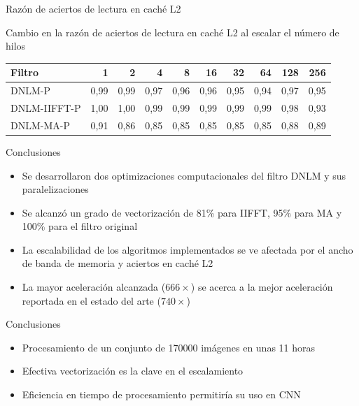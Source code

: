 \documentclass[15pt]{beamer} %
\begin{document}
\begin{frame}{Raz\'on de aciertos de lectura en cach\'e L2}
  
  \begin{center}
  \setlength\tabcolsep{2.5pt}
   \setlength{\textfloatsep}{25mm}
    {\footnotesize Cambio en la raz\'on de aciertos de lectura en cach\'e L2 al escalar el n\'umero de hilos}
    \begin{tabular}{lrrrrrrrrr}
	 Filtro & 1 & 2 & 4 & 8 & 16 & 32 & 64 & 128 & 256 \tabularnewline
	\hline
	DNLM-P & 0,99 & 0,99 & 0,97 & 0,96 & 0,96 & 0,95 & 0,94 & 0,97 & 0,95 \tabularnewline
	DNLM-IIFFT-P & 1,00 & 1,00 & 0,99 & 0,99 & 0,99 & 0,99 & 0,99 & 0,98 & 0,93 \tabularnewline
	DNLM-MA-P & 0,91 & 0,86 & 0,85 & 0,85 & 0,85 & 0,85 & 0,85 & 0,88 & 0,89 \tabularnewline
	\end{tabular}
  \end{center}
\end{frame}




\begin{frame}{Conclusiones}
  
  \begin{itemize}
  \item Se desarrollaron dos optimizaciones computacionales del filtro DNLM y sus paralelizaciones
  \item Se alcanz\'o un grado de vectorizaci\'on de 81\% para IIFFT, 95\% para MA y 100\% para el filtro original
  \item La escalabilidad de los algoritmos implementados se ve afectada por el ancho de banda de memoria y aciertos en cach\'e L2
  \item La mayor aceleraci\'on alcanzada ($666\times$) se acerca a la mejor aceleraci\'on reportada en el estado del arte ($740\times$)
  \end{itemize}
  
\end{frame}

\begin{frame}{Conclusiones}
  
  \begin{itemize}
  \item Procesamiento de un conjunto de 170000 im\'agenes en unas 11 horas
  \item Efectiva vectorizaci\'on es la clave en el escalamiento
  \item Eficiencia en tiempo de procesamiento permitir\'ia su uso en CNN	
  \end{itemize}
  
\end{frame}
\end{document}
